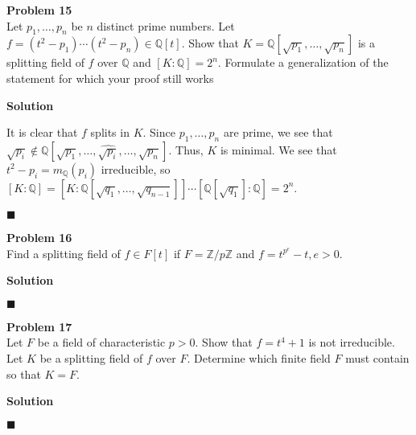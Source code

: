 \documentclass{article}
\theoremstyle{definition}
\newenvironment{problem}[2][Problem]
    { \begin{mdframed}[backgroundcolor=gray!20] \textbf{#1 #2} \\}
    {  \end{mdframed}}
\newenvironment{solution}{\textbf{Solution}}{%
     \hfill$\blacksquare$\par\medskip}
\begin{document}
    \begin{problem}{15}
    
    Let $p_1,\ldots,p_n$ be $n$ distinct prime numbers. Let $f = \left( t^{2} - p_1 \right) \cdots \left( t^{2} - p_n \right) \in \mathds{Q}\left[ t \right]$. Show that $K = \mathds{Q}\left[ \sqrt{p_1} ,\ldots,\sqrt{p_n} \right]$ is a splitting field of $f$ over $\mathds{Q}$ and $\left[ K : \mathds{Q} \right] = 2^{n}$. Formulate a generalization of the statement for which your proof still works

    
    \end{problem}
    
    \begin{solution}
    
    It is clear that $f$ splits in $K$. Since $p_1,\ldots,p_n$ are prime, we see that $\sqrt{p_i}  \not\in \mathds{Q}\left[ \sqrt{p_1} ,\ldots,\widehat{\sqrt{p_i} },\ldots,\sqrt{p_n}   \right]$. Thus, $K$ is minimal. We see that $t^{2} - p_i = m_{\mathds{Q}}\left( p_i \right)$ irreducible, so $\left[ K : \mathds{Q} \right] = \left[ K : \mathds{Q}\left[ \sqrt{q_1},\ldots,\sqrt{q_{n-1}}  \right] \right]\cdots \left[ \mathds{Q}\left[ \sqrt{q_1}  \right]: \mathds{Q} \right] = 2^{n}$.
    
    \end{solution}
    
    \begin{problem}{16}
    
    Find a splitting field of $f \in F \left[ t \right]$ if $F = \mathds{Z} / p\mathds{Z}$ and $f = t^{p^{e}} - t, e > 0$.
    
    \end{problem}
    
    \begin{solution}
    
    
    
    \end{solution}
    
    \begin{problem}{17}
    
    Let $F$ be a field of characteristic $p > 0$. Show that $f = t^{4} + 1$ is not irreducible. Let $K$ be a splitting field of $f$ over $F$. Determine which finite field $F$ must contain so that $K = F$.
    
    \end{problem}
    
    \begin{solution}
    
    
    
    \end{solution}
    
\end{document}
